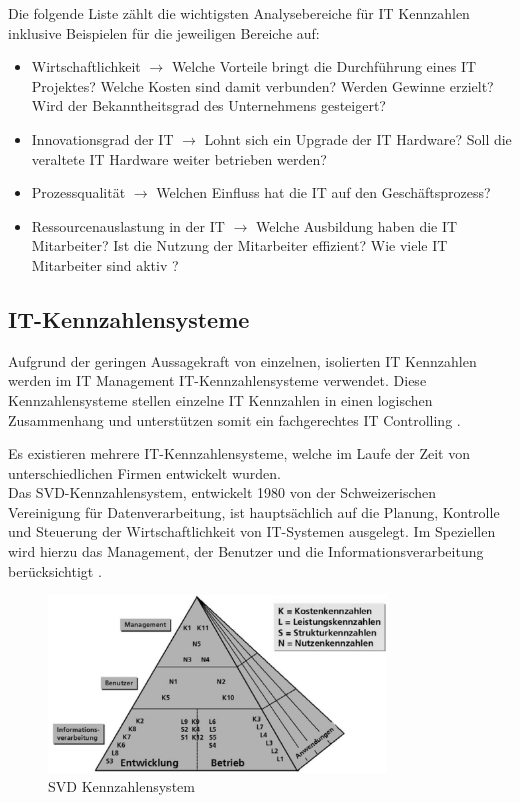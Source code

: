 Die folgende Liste zählt die wichtigsten Analysebereiche für IT Kennzahlen inklusive Beispielen für die jeweiligen Bereiche auf:

\begin{itemize}[noitemsep]
\item Wirtschaftlichkeit $\rightarrow$ Welche Vorteile bringt die Durchführung eines IT Projektes? Welche Kosten sind damit verbunden? Werden Gewinne erzielt? Wird der Bekanntheitsgrad des Unternehmens gesteigert?
\item Innovationsgrad der IT $\rightarrow$ Lohnt sich ein Upgrade der IT Hardware? Soll die veraltete IT Hardware weiter betrieben werden?
\item Prozessqualität $\rightarrow$ Welchen Einfluss hat die IT auf den Geschäftsprozess? 
\item Ressourcenauslastung in der IT $\rightarrow$ Welche Ausbildung haben die IT Mitarbeiter? Ist die Nutzung der Mitarbeiter effizient? Wie viele IT Mitarbeiter sind aktiv \cite{Gadatsch10}?
\end{itemize}

\subsection{IT-Kennzahlensysteme}

Aufgrund der geringen Aussagekraft von einzelnen, isolierten IT Kennzahlen werden im IT Management IT-Kennzahlensysteme verwendet. Diese Kennzahlensysteme stellen einzelne IT Kennzahlen in einen logischen Zusammenhang und unterstützen somit ein fachgerechtes IT Controlling \cite{Gadatsch10}. 

Es existieren mehrere IT-Kennzahlensysteme, welche im Laufe der Zeit von unterschiedlichen Firmen entwickelt wurden. \\
Das SVD-Kennzahlensystem, entwickelt 1980 von der Schweizerischen Vereinigung für Datenverarbeitung, ist hauptsächlich auf die Planung, Kontrolle und Steuerung der Wirtschaftlichkeit von IT-Systemen ausgelegt. Im Speziellen wird hierzu das Management, der Benutzer und die Informationsverarbeitung berücksichtigt \cite{Gadatsch10}.

\begin{figure}[h!]
	\centering
	\includegraphics[width=0.8\textwidth]{BilderAllgemein/svd_kennzahlensystem.PNG}
	\caption{SVD Kennzahlensystem \cite{Biethahn00}}
	\label{img:svd_kennzahlensystem}
\end{figure}

